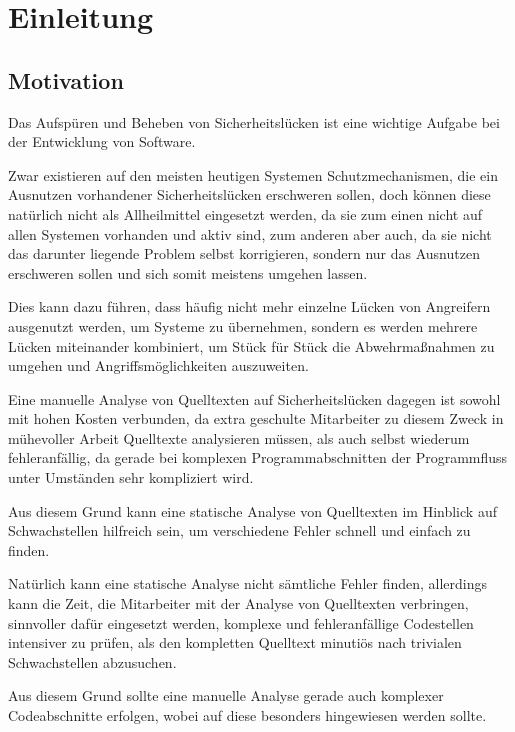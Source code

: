 \chapter{Einleitung}
    \section{Motivation}
        Das Aufspüren und
        Beheben von Sicherheitslücken ist eine wichtige Aufgabe bei der Entwicklung von Software.

        Zwar existieren auf den meisten heutigen Systemen Schutzmechanismen,
        die ein Ausnutzen vorhandener Sicherheitslücken erschweren sollen,
        doch können diese natürlich nicht als Allheilmittel eingesetzt werden,
        da sie zum einen nicht auf allen Systemen vorhanden und
        aktiv sind,
        zum anderen aber auch,
        da sie nicht das darunter liegende Problem selbst korrigieren,
        sondern nur das Ausnutzen erschweren sollen und
        sich somit meistens umgehen lassen.

        Dies kann dazu führen,
        dass häufig nicht mehr einzelne Lücken von Angreifern ausgenutzt werden,
        um Systeme zu übernehmen,
        sondern es werden mehrere Lücken miteinander kombiniert,
        um Stück für Stück die Abwehrmaßnahmen zu umgehen und
        Angriffsmöglichkeiten auszuweiten.

        Eine manuelle Analyse von Quelltexten auf Sicherheitslücken dagegen ist sowohl
        mit hohen Kosten verbunden,
        da extra geschulte Mitarbeiter zu diesem Zweck in mühevoller Arbeit Quelltexte analysieren müssen,
        als auch selbst wiederum fehleranfällig,
        da gerade bei komplexen Programmabschnitten der Programmfluss unter Umständen sehr kompliziert wird.

        Aus diesem Grund kann eine statische Analyse von Quelltexten im Hinblick auf Schwachstellen hilfreich sein,
        um verschiedene Fehler schnell und
        einfach zu finden.

        Natürlich kann eine statische Analyse nicht sämtliche Fehler finden,
        allerdings kann die Zeit,
        die Mitarbeiter mit der Analyse von Quelltexten verbringen,
        sinnvoller dafür eingesetzt werden,
        komplexe und
        fehleranfällige Codestellen intensiver zu prüfen,
        als den kompletten Quelltext minutiös nach trivialen Schwachstellen abzusuchen.

        Aus diesem Grund sollte eine manuelle Analyse gerade auch komplexer Codeabschnitte erfolgen,
        wobei auf diese besonders hingewiesen werden sollte.

